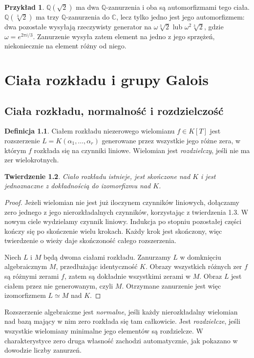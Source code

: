 \documentclass[11pt,a4paper,oneside]{book}
\numberwithin{equation}{section}
\theoremstyle{plain}
\newtheorem{twierdzenie}{Twierdzenie}[chapter]
\theoremstyle{definition}
\newtheorem{definicja}[twierdzenie]{Definicja}
\newtheorem{przyklad}[twierdzenie]{Przykład}
\theoremstyle{remark}
\newcommand{\Q}{\mathbb{Q}}
\newcommand{\C}{\mathbb{C}}
\begin{document}
\begin{przyklad}
$\Q(\sqrt2)$ ma dwa $\Q$-zanurzenia i oba są automorfizmami tego ciała. $\Q(\sqrt[3]{2})$ ma trzy $\Q$-zanurzenia do $\C$, lecz tylko jedno jest jego automorfizmem: dwa pozostałe wysyłają rzeczywisty generator na $\omega\sqrt[3]{2}$ lub $\omega^2\sqrt[3]{2}$, gdzie $\omega=e^{2\pi i/3}$. Zanurzenie wysyła zatem element na jedno z jego sprzężeń, niekoniecznie na element różny od niego.
\end{przyklad}


\chapter{Ciała rozkładu i grupy Galois}

\section{Ciała rozkładu, normalność i rozdzielczość}

\begin{definicja}
Ciałem rozkładu niezerowego wielomianu $f\in K[T]$ jest rozszerzenie $L=K(\alpha_1,\dots,\alpha_r)$ generowane przez wszystkie jego różne zera, w którym $f$ rozkłada się na czynniki liniowe. Wielomian jest \emph{rozdzielczy}, jeśli nie ma zer wielokrotnych.
\end{definicja}

\begin{twierdzenie}
Ciało rozkładu istnieje, jest skończone nad $K$ i jest jednoznaczne z dokładnością do izomorfizmu nad $K$.
\end{twierdzenie}
\begin{proof}
Jeżeli wielomian nie jest już iloczynem czynników liniowych, dołączamy zero jednego z jego nierozkładalnych czynników, korzystając z twierdzenia 1.3. W nowym ciele wydzielamy czynnik liniowy. Indukcja po stopniu pozostałej części kończy się po skończenie wielu krokach. Każdy krok jest skończony, więc twierdzenie o wieży daje skończoność całego rozszerzenia.

Niech $L$ i $M$ będą dwoma ciałami rozkładu. Zanurzamy $L$ w domknięciu algebraicznym $M$, przedłużając identyczność $K$. Obrazy wszystkich różnych zer $f$ są różnymi zerami $f$, zatem są dokładnie wszystkimi zerami w $M$. Obraz $L$ jest ciałem przez nie generowanym, czyli $M$. Otrzymane zanurzenie jest więc izomorfizmem $L\simeq M$ nad $K$.
\end{proof}

Rozszerzenie algebraiczne jest \emph{normalne}, jeśli każdy nierozkładalny wielomian nad bazą mający w nim zero rozkłada się tam całkowicie. Jest \emph{rozdzielcze}, jeśli wszystkie wielomiany minimalne jego elementów są rozdzielcze. W charakterystyce zero druga własność zachodzi automatycznie, jak pokazano w dowodzie liczby zanurzeń.
\end{document}
